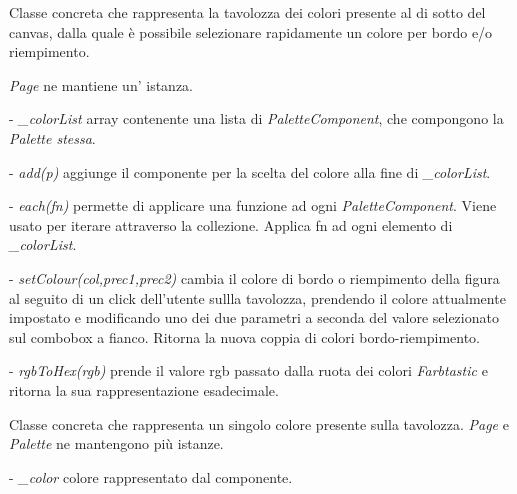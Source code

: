 Classe concreta che rappresenta la tavolozza dei colori presente al di sotto del canvas, dalla quale \` e possibile selezionare rapidamente un colore per bordo e/o riempimento.

\textit{Page} ne mantiene un' istanza.
\begin{elencopuntato}[\subsubsecindent]
\item[-] \textit{{\_}colorList} array contenente una lista di \textit{PaletteComponent}, che compongono la \textit{Palette stessa}.
\end{elencopuntato}
\begin{elencopuntato}[\subsubsecindent]
\item[-] \textit{add(p)} aggiunge il componente per la scelta del colore alla fine di \textit{{\_}colorList}.
\item[-]  \textit{each(fn)} permette di applicare una funzione ad ogni \textit{PaletteComponent}. Viene usato per iterare attraverso la collezione. Applica fn ad ogni elemento di \textit{{\_}colorList}. 
\item[-]  \textit{setColour(col,prec1,prec2)} cambia il colore di bordo o riempimento della figura al seguito di un click dell'utente sullla tavolozza, prendendo il colore attualmente impostato e modificando uno dei due parametri a seconda del valore selezionato sul combobox a fianco. Ritorna la nuova coppia di colori bordo-riempimento.
\item[-]  \textit{rgbToHex(rgb)} prende il valore rgb passato dalla ruota dei colori \textit{Farbtastic} e ritorna la sua rappresentazione esadecimale.
\end{elencopuntato}

Classe concreta che rappresenta un singolo colore presente sulla tavolozza.
\textit{Page} e \textit{Palette} ne mantengono pi\`u istanze.
\begin{elencopuntato}[\subsubsecindent]
\item[-] \textit{{\_}color} colore rappresentato dal componente.
\end{elencopuntato}


